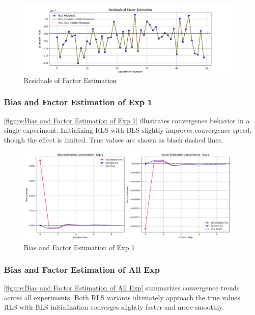 \documentclass[openany,12pt,UTF8]{article}
\begin{document}
\begin{figure}[h]\centering
\includegraphics[width=\columnwidth]{figures/Residuals of Factor Estimation.png}
\caption{Residuals of Factor Estimation}
\label{figure:Residuals of Factor Estimation}
\end{figure}

\subsubsection{Bias and Factor Estimation of Exp 1}
\autoref{figure:Bias and Factor Estimation of Exp 1} illustrates convergence behavior in a single experiment. Initializing RLS with BLS slightly improves convergence speed, though the effect is limited. True values are shown as black dashed lines.

\begin{figure}[h]\centering
\includegraphics[width=\columnwidth]{figures/Bias and Factor Estimation of Exp 1.png}
\caption{Bias and Factor Estimation of Exp 1}
\label{figure:Bias and Factor Estimation of Exp 1}
\end{figure}

\subsubsection{Bias and Factor Estimation of All Exp}
\autoref{figure:Bias and Factor Estimation of All Exp} summarizes convergence trends across all experiments. Both RLS variants ultimately approach the true values. RLS with BLS initialization converges slightly faster and more smoothly.
\end{document}
